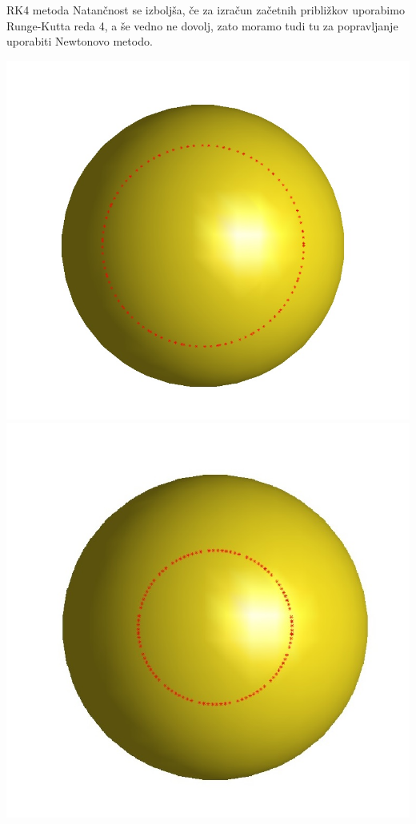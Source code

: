 \documentclass{beamer}
\begin{document}
	\begin{frame}{RK4 metoda}
		Natančnost se izboljša, če za izračun začetnih približkov uporabimo Runge-Kutta reda 4, a še vedno ne dovolj, zato moramo tudi tu za popravljanje uporabiti Newtonovo metodo.
		
		\includegraphics[scale=0.30]{rk4}
		\includegraphics[scale=0.30]{rk4_newt}
		
	\end{frame}
	
\end{document}
